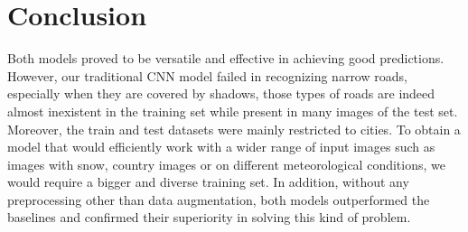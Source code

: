 \documentclass[10pt,conference,compsocconf]{IEEEtran}
\begin{document}
\section{Conclusion}
\label{sec:conclusion}
Both models proved to be versatile and effective in achieving good predictions. However, our traditional CNN model failed in recognizing narrow roads, especially when they are covered by shadows, those types of roads are indeed almost inexistent in the training set while present in many images of the test set. Moreover, the train and test datasets were mainly restricted to cities. To obtain a model that would efficiently work with a wider range of input images such as images with snow, country images or on different meteorological conditions, we would require a bigger and diverse training set. In addition, without any preprocessing other than data augmentation, both models outperformed the baselines and confirmed their superiority in solving this kind of problem.




\end{document}
